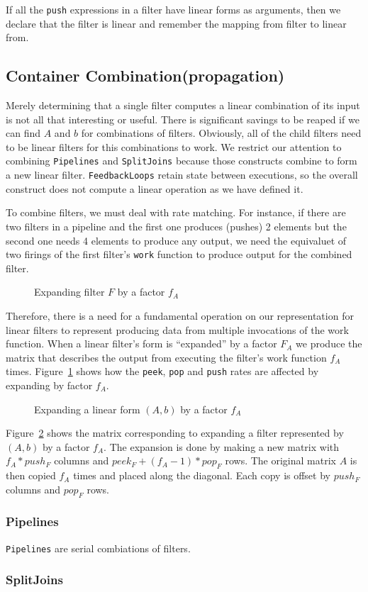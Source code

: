 If all the {\tt push} expressions in a filter have linear forms as arguments, then we declare
that the filter is linear and remember the mapping from filter to linear from.

\subsection{Container Combination(propagation)}
Merely determining that a single filter computes a linear combination of its input is not
all that interesting or useful. There is significant savings to be reaped if we can
find $A$ and $b$ for combinations of filters. Obviously, all of the child filters need
to be linear filters for this combinations to work. We restrict our attention to combining
{\tt Pipelines} and {\tt SplitJoins} because those constructs combine to form a new linear filter. 
{\tt FeedbackLoops} retain state between executions, so the overall construct 
does not compute a linear operation as we have defined it. 

To combine filters, we must deal with rate matching. For instance, if there are two
filters in a pipeline and the first one produces (pushes) 2 elements but the second one
needs 4 elements to produce any output, we need the equivaluet of two firings of the
first filter's {\tt work} function to produce output for the combined filter. 

\begin{figure}
\center
\epsfxsize=2.5in
\caption{Expanding filter $F$ by a factor $f_{A}$}
\label{fig:expanding-a-filter}
\end{figure}


Therefore, there is a need for a fundamental operation on our representation for 
linear filters to represent producing data from multiple invocations of the work
function. When a linear filter's form is ``expanded'' by a factor $F_{A}$ 
we produce the matrix that describes the output from executing the filter's work
function $f_{A}$ times. Figure~\ref{fig:expanding-a-filter} shows how the {\tt peek},
{\tt pop} and  {\tt push} rates are affected by expanding by factor $f_{A}$.

\begin{figure}
\center
\epsfxsize=2.5in
\caption{Expanding a linear form $(A,b)$ by a factor $f_{A}$}
\label{fig:expanding-a-matrix}
\end{figure}

Figure~\ref{fig:expanding-a-matrix} shows the matrix corresponding to expanding 
a filter represented by $(A,b)$ by a factor $f_{A}$. The expansion is done by 
making a new matrix with $f_{A}*push_{F}$ columns and $peek_{F}+(f_{A}-1)*pop_{F}$
rows. The original matrix $A$ is then copied $f_{A}$ times and placed along the
diagonal. Each copy is offset by $push_{F}$ columns and $pop_{F}$ rows.

\subsubsection{Pipelines}
{\tt Pipelines} are serial combiations of filters. 


\subsubsection{SplitJoins}